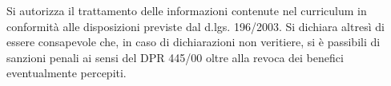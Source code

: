 
\begin{cvletter}

    Si autorizza il trattamento delle informazioni contenute nel curriculum in conformit\`a alle disposizioni previste dal d.lgs. 196/2003. Si dichiara altres\`i di essere consapevole che, in caso
    di dichiarazioni non veritiere, si \`e passibili di sanzioni penali ai sensi del DPR 445/00 oltre alla revoca dei benefici eventualmente percepiti.
  
\end{cvletter}
